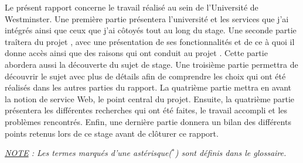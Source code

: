 Le pr\'esent rapport concerne le travail r\'ealis\'e au sein de l'Universit\'e de Westminster.
Une premi\`ere partie pr\'esentera l'universit\'e et les services que j'ai int\'egr\'es ainsi que ceux que j'ai c\^otoy\'es tout au long du stage.
Une seconde partie tra\^itera du projet \Yuukou{}, avec une pr\'esentation de ses fonctionnalit\'es et de ce \`a quoi il donne acc\`es  ainsi que des raisons qui ont conduit au projet \YuukouII.
Cette partie abordera aussi la d\'ecouverte du sujet de stage.
Une troisi\`eme partie permettra de d\'ecouvrir le sujet avec plus de d\'etails afin de comprendre les choix qui ont \'et\'e r\'ealis\'es dans les autres parties du rapport.
La quatri\`eme partie mettra en avant la notion de service Web, le point central du projet.
Ensuite, la quatri\`eme partie pr\'esentera les diff\'erentes recherches qui ont \'et\'e faites, le travail accompli et les probl\`emes rencontr\'es.
Enfin, une derni\`ere partie donnera un bilan des diff\'erents points retenus lors de ce stage avant de cl\^oturer ce rapport.

\vspace{1.5cm}

\begin{center}
\textit{\underline{NOTE} : Les termes marqu\'es d'une ast\'erisque($^*$) sont d\'efinis dans le glossaire.}

\end{center}

\clearpage
